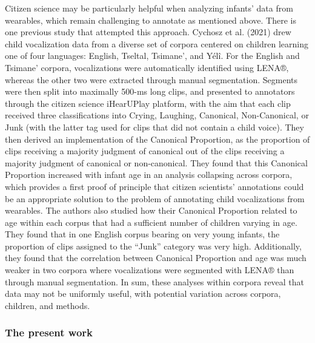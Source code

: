 \documentclass[english,,man]{apa6}
\begin{document}
Citizen science may be particularly helpful when analyzing infants' data from wearables, which remain challenging to annotate as mentioned above. There is one previous study that attempted this approach. Cychosz et al. (2021) drew child vocalization data from a diverse set of corpora centered on children learning one of four languages: English, Tseltal, Tsimane', and Yélî. For the English and Tsimane' corpora, vocalizations were automatically identified using LENA®, whereas the other two were extracted through manual segmentation. Segments were then split into maximally 500-ms long clips, and presented to annotators through the citizen science iHearUPlay platform, with the aim that each clip received three classifications into Crying, Laughing, Canonical, Non-Canonical, or Junk (with the latter tag used for clips that did not contain a child voice). They then derived an implementation of the Canonical Proportion, as the proportion of clips receiving a majority judgment of canonical out of the clips receiving a majority judgment of canonical or non-canonical. They found that this Canonical Proportion increased with infant age in an analysis collapsing across corpora, which provides a first proof of principle that citizen scientists' annotations could be an appropriate solution to the problem of annotating child vocalizations from wearables. The authors also studied how their Canonical Proportion related to age within each corpus that had a sufficient number of children varying in age. They found that in one English corpus bearing on very young infants, the proportion of clips assigned to the \enquote{Junk} category was very high. Additionally, they found that the correlation between Canonical Proportion and age was much weaker in two corpora where vocalizations were segmented with LENA® than through manual segmentation. In sum, these analyses within corpora reveal that data may not be uniformly useful, with potential variation across corpora, children, and methods.

\hypertarget{the-present-work}{%
\subsubsection{The present work}\label{the-present-work}}
\end{document}
